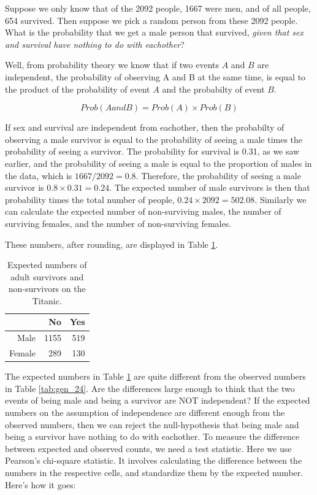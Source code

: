 \documentclass[]{report}\usepackage[]{graphicx}\usepackage[]{color}
\begin{document}
Suppose we only know that of the 2092 people, 1667 were men, and of all people, 654 survived. Then suppose we pick a random person from these 2092 people. What is the probability that we get a male person that survived, \textit{given that sex and survival have nothing to do with eachother}?

Well, from probability theory we know that if two events $A$ and $B$ are independent, the probability of observing A and B at the same time, is equal to the product of the probability of event $A$ and the probabilty of event $B$.

\begin{equation}
Prob(A and B) = Prob(A) \times Prob(B)
\end{equation}

If sex and survival are independent from eachother, then the probabilty of observing a male survivor is equal to the probability of seeing a male times the probability of seeing a survivor. The probability for survival is 0.31, as we saw earlier, and the probability of seeing a male is equal to the proportion of males in the data, which is $1667/2092 =0.8$. Therefore, the probability of seeing a male survivor is $0.8 \times 0.31 =0.24 $. The expected number of male survivors is then that probability times the total number of people, $0.24 \times 2092= 502.08$. Similarly we can calculate the expected number of non-surviving males, the number of surviving females, and the number of non-surviving females.


These numbers, after rounding, are displayed in Table \ref{tab:gen_27}.


\begin{table}[ht]
\centering
\caption{Expected numbers of adult survivors and non-survivors on the Titanic.} 
\label{tab:gen_27}
\begin{tabular}{rrr}
  \hline
 & No & Yes \\ 
  \hline
Male & 1155 & 519 \\ 
  Female & 289 & 130 \\ 
   \hline
\end{tabular}
\end{table}



The expected numbers in Table \ref{tab:gen_27} are quite different from the observed numbers in Table \ref{tab:gen_24}. Are the differences large enough to think that the two events of being male and being a survivor are NOT independent? If the expected numbers on the assumption of independence are different enough from the observed numbers, then we can reject the null-hypothesis that being male and being a survivor have nothing to do with eachother. To measure the difference between expected and observed counts, we need a test statistic. Here we use Pearson's chi-square statistic. It involves calculating the difference between the numbers in the respective cells, and standardize them by the expected number. Here's how it goes:
\end{document}
